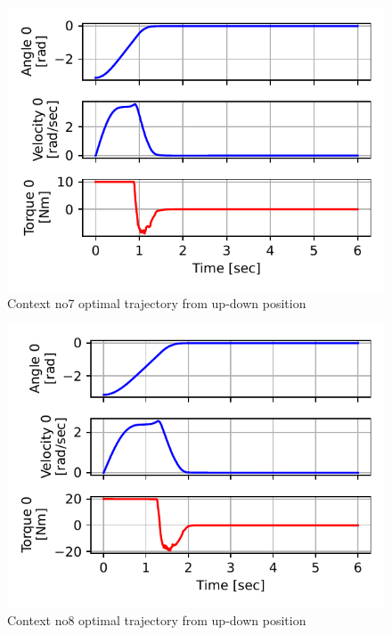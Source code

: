 \newpage
\begin{figure}[p]
\begin{center}
\includegraphics[width=0.99\linewidth]{fig/c7_traj.pdf}
\caption{Context no7 optimal trajectory from up-down position}\label{fig:c7_traj}
\end{center}
\end{figure}


\begin{figure}[p]
\begin{center}
\includegraphics[width=0.99\linewidth]{fig/c8_traj.pdf}
\caption{Context no8 optimal trajectory from up-down position}\label{fig:c8_traj}
\end{center}
\end{figure}

